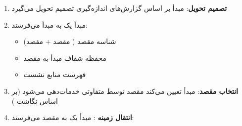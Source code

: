 
\begin{enumerate}
\def\labelenumi{\arabic{enumi}.}
\tightlist
\item
  \textbf{تصمیم تحویل}:  مبدأ بر اساس گزارش‌های اندازه‌گیری تصمیم تحویل می‌گیرد
\item
   مبدأ یک  به  مبدأ می‌فرستد:

  \begin{itemize}
  \tightlist
  \item
    شناسه مقصد ( مقصد +  مقصد)
  \item
    محفظه شفاف  مبدأ-به-مقصد
  \item
    فهرست منابع نشست 
  \end{itemize}
\item
  \textbf{انتخاب  مقصد}:  مبدأ تعیین می‌کند  مقصد توسط  متفاوتی خدمات‌دهی می‌شود (بر اساس نگاشت )
\item
  \textbf{انتقال زمینه }:  مبدأ یک  به  مقصد می‌فرستد:


\end{enumerate}
